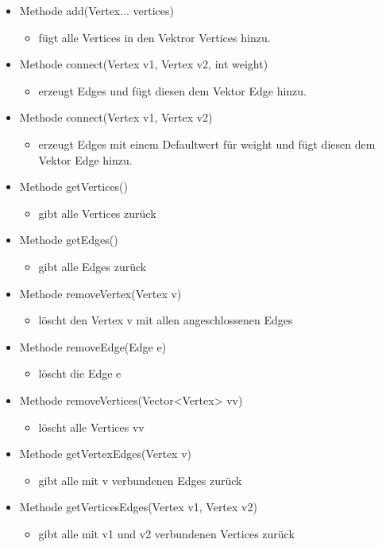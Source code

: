 \documentclass[a4paper,titlepage]{article}
\begin{document}
\begin{itemize}
\item Methode add(Vertex... vertices)
\begin{itemize}\item fügt alle Vertices in den Vektror Vertices hinzu.\end{itemize}
\item Methode connect(Vertex v1, Vertex v2, int weight)
\begin{itemize}\item erzeugt Edges und fügt diesen dem Vektor Edge hinzu.\end{itemize}
\item Methode connect(Vertex v1, Vertex v2)
\begin{itemize}\item erzeugt Edges mit einem Defaultwert für weight und fügt diesen dem Vektor Edge hinzu.\end{itemize}
\item Methode getVertices()
\begin{itemize}\item gibt alle Vertices zurück\end{itemize}
\item Methode getEdges()
\begin{itemize}\item gibt alle Edges zurück\end{itemize}
\item Methode removeVertex(Vertex v)
\begin{itemize}\item löscht den Vertex v mit allen angeschlossenen Edges\end{itemize}
\item Methode removeEdge(Edge e)
\begin{itemize}\item löscht die Edge e\end{itemize}
\item Methode removeVertices(Vector<Vertex> vv)
\begin{itemize}\item löscht alle Vertices vv\end{itemize}
\item Methode getVertexEdges(Vertex v)
\begin{itemize}\item gibt alle mit v verbundenen Edges zurück\end{itemize}
\item Methode getVerticesEdges(Vertex v1, Vertex v2)
\begin{itemize}\item gibt alle mit v1 und v2 verbundenen Vertices zurück\end{itemize}
\end{itemize}
\end{document}
